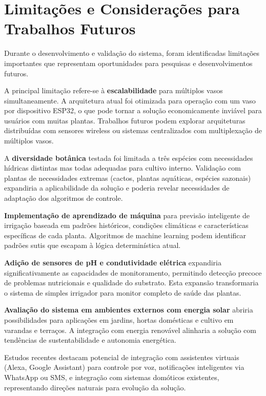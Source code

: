 \documentclass[twoside,english,brazilian]{UNISINOSmonografia}
\begin{document}
\section{Limitações e Considerações para Trabalhos Futuros}

Durante o desenvolvimento e validação do sistema, foram identificadas limitações importantes que representam oportunidades para pesquisas e desenvolvimentos futuros.

A principal limitação refere-se à \textbf{escalabilidade} para múltiplos vasos simultaneamente. A arquitetura atual foi otimizada para operação com um vaso por dispositivo ESP32, o que pode tornar a solução economicamente inviável para usuários com muitas plantas. Trabalhos futuros podem explorar arquiteturas distribuídas com sensores wireless ou sistemas centralizados com multiplexação de múltiplos vasos.

A \textbf{diversidade botânica} testada foi limitada a três espécies com necessidades hídricas distintas mas todas adequadas para cultivo interno. Validação com plantas de necessidades extremas (cactos, plantas aquáticas, espécies sazonais) expandiria a aplicabilidade da solução e poderia revelar necessidades de adaptação dos algoritmos de controle.

\textbf{Implementação de aprendizado de máquina} para previsão inteligente de irrigação baseada em padrões históricos, condições climáticas e características específicas de cada planta. Algoritmos de machine learning podem identificar padrões sutis que escapam à lógica determinística atual.

\textbf{Adição de sensores de pH e condutividade elétrica} expandiria significativamente as capacidades de monitoramento, permitindo detecção precoce de problemas nutricionais e qualidade do substrato. Esta expansão transformaria o sistema de simples irrigador para monitor completo de saúde das plantas.

\textbf{Avaliação do sistema em ambientes externos com energia solar} abriria possibilidades para aplicações em jardins, hortas domésticas e cultivo em varandas e terraços. A integração com energia renovável alinharia a solução com tendências de sustentabilidade e autonomia energética.

Estudos recentes \cite{future2024} destacam potencial de integração com assistentes virtuais (Alexa, Google Assistant) para controle por voz, notificações inteligentes via WhatsApp ou SMS, e integração com sistemas domóticos existentes, representando direções naturais para evolução da solução.
\end{document}

